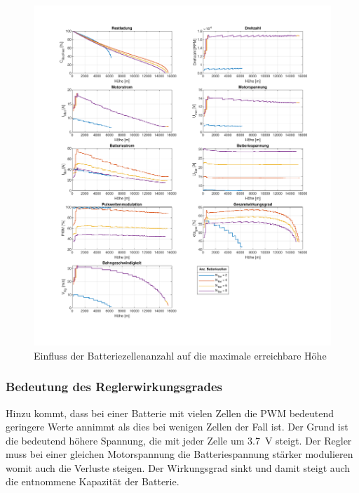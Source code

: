 \begin{figure}[H]
\centering
	\includegraphics[scale=0.70]{Diagramme/Untersuchung_N_Bat.pdf}
	\caption{Einfluss der Batteriezellenanzahl auf die maximale erreichbare Höhe}
	\label{abb:N_Bat_einfluss}
\end{figure}

\subsubsection{Bedeutung des Reglerwirkungsgrades}
Hinzu kommt, dass bei einer Batterie mit vielen Zellen die PWM bedeutend geringere Werte annimmt als dies bei wenigen Zellen der Fall ist. Der Grund ist die bedeutend höhere Spannung, die mit jeder Zelle um \SI{3,7}{V} steigt. Der Regler muss bei einer gleichen Motorspannung die Batteriespannung stärker modulieren womit auch die Verluste steigen. Der Wirkungsgrad sinkt und damit steigt auch die entnommene Kapazität der Batterie.


